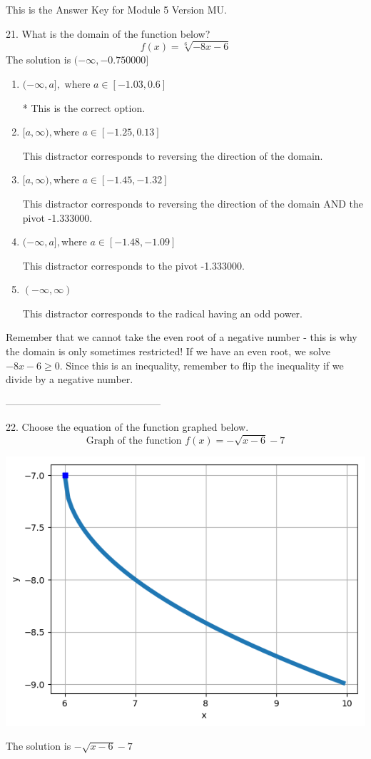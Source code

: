 \documentclass{article}[10pt]
\begin{document}
This is the Answer Key for Module 5 Version MU.

21. What is the domain of the function below?
$$ f(x) = \sqrt[6]{-8 x - 6} $$ 
The solution is $ (-\infty, -0.750000] $ 

\begin{enumerate}[label=\Alph*.] 
\item $ (-\infty, a], \text{ where } a \in [-1.03, 0.6] $ 

 * This is the correct option. 
\item $ [a, \infty), \text{where } a \in [-1.25, 0.13] $ 

 This distractor corresponds to reversing the direction of the domain. 
\item $ [a, \infty), \text{where } a \in [-1.45, -1.32] $ 

 This distractor corresponds to reversing the direction of the domain AND the pivot -1.333000. 
\item $ (-\infty, a], \text{where } a \in [-1.48, -1.09] $ 

 This distractor corresponds to the pivot -1.333000. 
\item $ (-\infty, \infty) $ 

 This distractor corresponds to the radical having an odd power. 
\end{enumerate} 
 
Remember that we cannot take the even root of a negative number - this is why the domain is only sometimes restricted! If we have an even root, we solve $-8 x - 6 \geq 0$. Since this is an inequality, remember to flip the inequality if we divide by a negative number.

-----------------------------------------------

22. Choose the equation of the function graphed below.
$$ \text{Graph of the function } f(x) = - \sqrt{x - 6} - 7 $$ 
\begin{center}\includegraphics[scale=0.5]{../Figures/question22MU.png}\end{center}The solution is $ - \sqrt{x - 6} - 7 $ 
\end{document}
